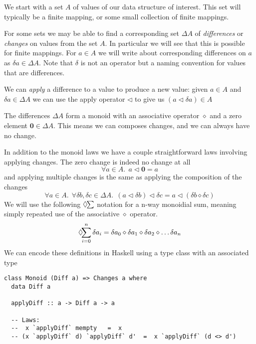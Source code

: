 \documentclass[11pt,a4paper]{article}
\begin{document}
We start with a set $A$ of values of our data structure of interest. This set
will typically be a finite mapping, or some small collection of finite mappings.

For some sets we may be able to find a corresponding set $\Delta{A}$ of
\emph{differences} or \emph{changes} on values from the set $A$. In particular
we will see that this is possible for finite mappings. For $a \in A$ we will
write about corresponding differences on $a$ as $\delta{a} \in \Delta{A}$.
Note that $\delta$ is not an operator but a naming convention for values that
are differences.

We can \emph{apply} a difference to a value to produce a new value: given
$a \in A$ and $\delta{a} \in \Delta{A}$ we can use the apply operator
$\triangleleft$ to give us $(a \triangleleft \delta{a}) \in A$

The differences $\Delta{A}$ form a monoid with an associative operator
$\diamond$ and a zero element $\mathbf{0} \in \Delta{A}$. This means we can
composes changes, and we can always have no change.

In addition to the monoid laws we have a couple straightforward laws involving
applying changes. The zero change is indeed no change at all
\begin{equation}
  \forall a \in A. ~~ a \triangleleft \mathbf{0} = a
\end{equation}
and applying multiple changes is the same as applying the composition of the
changes
\begin{equation}
\label{eq:apply-compose}
  \forall a \in A. ~~ \forall \delta{b}, \delta{c} \in \Delta{A}. ~~
    (a \triangleleft \delta{b}) \triangleleft \delta{c}
  = a \triangleleft (\delta{b} \diamond \delta{c})
\end{equation}
We will use the following $\Diamond\hspace{-3pt}\sum$ notation for a n-way monoidial sum, meaning simply
repeated use of the associative $\diamond$ operator.
\[
\Diamond\hspace{-4pt}\sum_{i=0}^n{\delta{a_i}}
= \delta{a_0} \diamond \delta{a_1} \diamond \delta{a_2} \diamond \ldots \delta{a_n}
\]
We can encode these definitions in Haskell using a type class with an associated
type
\begin{verbatim}
class Monoid (Diff a) => Changes a where
  data Diff a

  applyDiff :: a -> Diff a -> a

  -- Laws:
  --  x `applyDiff` mempty   =  x
  -- (x `applyDiff` d) `applyDiff` d'  =  x `applyDiff` (d <> d')
\end{verbatim}
\end{document}
